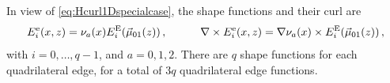 In view of \eqref{eq:Hcurl1Dspecialcase}, the shape functions and their curl are
\begin{equation}
		E_i^\mathrm{e}(x,z)=\nu_a(x)E_i^{\mathrm{E}}(\vec{\mu}_{01}(z))\,,\qquad\quad
		\nabla\times E_i^\mathrm{e}(x,z)=\nabla\nu_a(x)\times E_i^{\mathrm{E}}(\vec{\mu}_{01}(z))\,,
\end{equation}
with $i=0,\ldots,q-1$, and $a=0,1,2$. 
There are $q$ shape functions for each quadrilateral edge, for a total of $3q$ quadrilateral edge functions.


